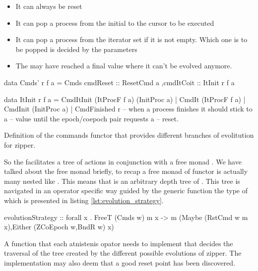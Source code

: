 \begin{itemize}
\item It can always be reset
\item It can pop a process from the initial to the cursor to be executed
\item It can pop a process from the iterator set if it is not
  empty. Which one is to be popped is decided by the parameters
\item The may have reached a final value where it can't be evolved
  anymore.
\end{itemize}

\begin{code}
\begin{haskellcode}
data Cmds' r f a =
  Cmds { cmdReset :: ResetCmd a
        ,cmdItCoit :: ItInit r f a
       }

data ItInit r f a
  = CmdItInit (ItProcF f a) (InitProc a)
  | CmdIt (ItProcF f a)
  | CmdInit (InitProc a)
  | CmdFinished r -- when a process finishes it should stick to a
                  -- value until the epoch/coepoch pair requests a
                  -- reset.
\end{haskellcode}
\label{lst:cmds_def}
\caption{Definition of the commands functor that provides different
  branches of evolitution for zipper.}
\end{code}

So the  facilitates a tree of actions in conjunction with a
free monad .  We have talked about the free monad briefly, to recap a
free monad of functor  is actually many  nested like
. This means that  is
an arbitrary depth tree of . This tree is navigated in an
operator specific way guided by the generic function
 the type of which is presented in listing
\ref{lst:evolution_strategy}.

\begin{code}
\begin{haskellcode}
evolutionStrategy
  :: forall x .
  FreeT (Cmds w) m x
  -> m (Maybe (RstCmd w m x),Either (ZCoEpoch w,BndR w) x)
\end{haskellcode}
\label{lst:evolution_strategy}
\caption{A function that each atnistenis opator needs to implement
  that decides the traversal of the tree created by the different
  possible evolutions of zipper. The implementation may also deem that
  a good reset point has been discovered.}
\end{code}

